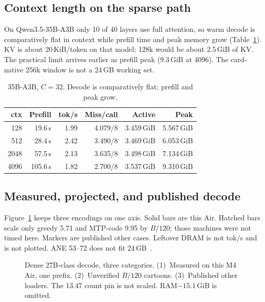 \documentclass[11pt]{article}
\theoremstyle{definition}
\begin{document}
\subsection{Context length on the sparse path}
\label{sec:eval-ctx}

On Qwen3.5-35B-A3B only 10 of 40 layers use full attention, so warm decode is comparatively flat in context while prefill time and peak memory grow (Table~\ref{tab:ctx}). KV is about 20\,KiB/token on that model; 128k would be about 2.5\,GiB of KV. The practical limit arrives earlier as prefill peak (9.3\,GiB at 4096). The card-native 256k window is not a 24\,GB working set.

\begin{table}[t]
\centering
\caption{35B-A3B, $C{=}32$. Decode is comparatively flat; prefill and peak grow.}
\label{tab:ctx}
\small
\begin{tabular}{@{}rrrrrr@{}}
\toprule
ctx & Prefill & tok/s & Miss/call & Active & Peak \\
\midrule
128 & 19.6\,s & 1.99 & 4.079/8 & 3.459\,GiB & 5.567\,GiB \\
512 & 28.4\,s & 2.42 & 3.490/8 & 3.469\,GiB & 6.053\,GiB \\
2048 & 57.5\,s & 2.13 & 3.635/8 & 3.498\,GiB & 7.134\,GiB \\
4096 & 105.6\,s & 1.82 & 2.700/8 & 3.537\,GiB & 9.310\,GiB \\
\bottomrule
\end{tabular}
\end{table}

\subsection{Measured, projected, and published decode}
\label{sec:eval-bw}

Figure~\ref{fig:bw} keeps three encodings on one axis. Solid bars are this Air. Hatched bars scale only greedy 5.71 and MTP-code 9.95 by $B/120$; those machines were not timed here. Markers are published other cases. Leftover DRAM is not tok/s and is not plotted. ANE 53--72 does not fit 24\,GB~\citep{weschera2026}.

\begin{figure}[t]
\centering
{}
\caption{Dense 27B-class decode, three categories. (1)~Measured on this M4 Air, one prefix. (2)~Unverified $B/120$ cartoons. (3)~Published other loaders. The 13.47 count pin is not scaled. RAM${-}15.1$\,GiB is omitted.}
\label{fig:bw}
\end{figure}
\end{document}
